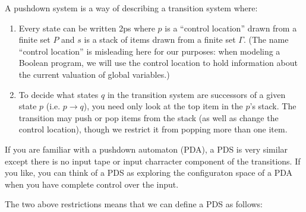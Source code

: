 \documentclass{article}
\newcommand{\config}{2}{\ensuremath{\langle #1, #2 \rangle}}
\begin{document}
A pushdown system is a way of describing a transition system where:
\begin{enumerate}
\item Every state can be written \config{p}{s} where $p$ is a
  ``control location'' drawn from a finite set $P$ and $s$ is a stack
  of items drawn from a finite set $\Gamma$. (The name ``control
  location'' is misleading here for our purposes: when modeling a
  Boolean program, we will use the control location to hold
  information about the current valuation of global variables.)
\item To decide what states $q$ in the transition system are
  successors of a given state $p$ (i.e. $p \rightarrow q$), you need
  only look at the top item in the $p$'s stack. The transition may
  push or pop items from the stack (as well as change the control
  location), though we restrict it from popping more than one item.
\end{enumerate}

If you are familiar with a pushdown automaton (PDA), a PDS is very
similar except there is no input tape or input charracter component of
the transitions. If you like, you can think of a PDS as exploring the
configuraton space of a PDA when you have complete control over the
input.

The two above restrictions means that we can define a PDS as follows:
\end{document}
